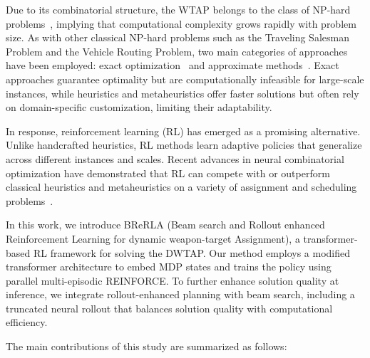 \documentclass{ieeeaccess}
\begin{document}

Due to its combinatorial structure, the WTAP belongs to the class of NP-hard problems~\cite{lloyd1986weapons}, implying that computational complexity grows rapidly with problem size. As with other classical NP-hard problems such as the Traveling Salesman Problem and the Vehicle Routing Problem, two main categories of approaches have been employed: exact optimization~\cite{ahuja2007exact,johansson2011mixed,lee2019real} and approximate methods~\cite{lee2003genetic,karasakal2009efficient,li2021novel}. Exact approaches guarantee optimality but are computationally infeasible for large-scale instances, while heuristics and metaheuristics offer faster solutions but often rely on domain-specific customization, limiting their adaptability.

In response, reinforcement learning (RL) has emerged as a promising alternative. Unlike handcrafted heuristics, RL methods learn adaptive policies that generalize across different instances and scales. Recent advances in neural combinatorial optimization have demonstrated that RL can compete with or outperform classical heuristics and metaheuristics on a variety of assignment and scheduling problems~\cite{lee2024attention,kool2018attention,kwon2020pomo}.

In this work, we introduce BReRLA (Beam search and Rollout enhanced Reinforcement Learning for dynamic weapon-target Assignment), a transformer-based RL framework for solving the DWTAP. Our method employs a modified transformer architecture to embed MDP states and trains the policy using parallel multi-episodic REINFORCE. To further enhance solution quality at inference, we integrate rollout-enhanced planning with beam search, including a truncated neural rollout that balances solution quality with computational efficiency.

The main contributions of this study are summarized as follows:
\end{document}
